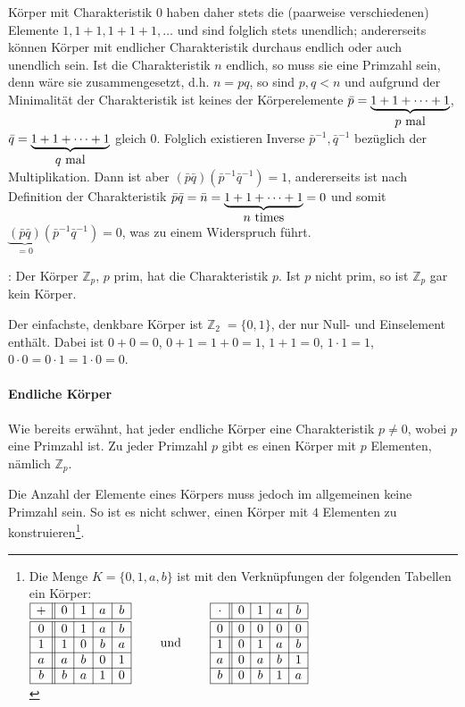 \begin{refsegment}
Körper mit Charakteristik $0$ haben daher stets die (paarweise verschiedenen) Elemente $1, 1+1, 1+1+1, \dots$ und sind folglich stets unendlich; andererseits können Körper mit endlicher Charakteristik durchaus endlich oder auch unendlich sein.
Ist die Charakteristik $n$ endlich, so muss sie eine Primzahl sein, denn wäre sie zusammengesetzt, d.h. $n=pq$, so sind $p,q<n$ und aufgrund der Minimalität der Charakteristik ist keines der Körperelemente $\bar p=\underbrace{1 + 1 + \cdots + 1}_{\hbox{$p$ mal}}$, $\bar q=\underbrace{1 + 1 + \cdots + 1}_{\hbox{$q$ mal}}$ gleich $0$. Folglich existieren Inverse $\bar p^{-1},\bar q^{-1}$ bezüglich der Multiplikation. Dann ist aber $(\bar p\bar q)( \bar p^{-1}\bar q^{-1})=1$, andererseits ist nach Definition der Charakteristik $\bar p\bar q=\bar n=\underbrace{1+1+\dots+1}_{\hbox{$n$ times}}=0$ und somit $\underbrace{(\bar p\bar q)}_{=0}( \bar p^{-1}\bar q^{-1})=0$, was zu einem Widerspruch führt.

\begin{example}{:} Der Körper ${\mathbb Z}_p$, $p$ prim, hat die Charakteristik $p$. Ist $p$ nicht prim, so ist ${\mathbb Z}_p$ gar kein Körper.
\end{example}

Der einfachste, denkbare Körper ist ${\mathbb Z}_2 \; = \{ 0,1\}$, der nur Null- und Einselement enthält. Dabei ist $0+0=0$, $0+1=1+0=1$, $1+1=0$, $1\cdot 1=1$, $0\cdot 0=0\cdot 1=1\cdot 0=0$.

\paragraph*{Endliche Körper}
Wie bereits erwähnt, hat jeder endliche Körper eine Charakteristik $p\ne 0$, wobei $p$ eine Primzahl ist. Zu jeder Primzahl $p$ gibt es einen Körper mit $p$ Elementen, nämlich ${\mathbb Z}_p$.

Die Anzahl der Elemente eines Körpers muss jedoch im allgemeinen keine Primzahl sein. So ist es nicht schwer, einen Körper mit $4$ Elementen zu konstruieren\footnote{%
Die Menge $K=\{0,1,a,b\}$ ist mit den Verknüpfungen der folgenden Tabellen ein Körper:\\
$
\begin{array}{|c||c|c|c|c|}
\hline
+ & 0 & 1 & a & b\\
\hline \hline
0 & 0 & 1 & a & b\\
\hline
1 & 1 & 0 & b & a\\
\hline
a & a & b & 0 & 1\\
\hline
b & b & a & 1 & 0\\
\hline
\end{array} \qquad {\rm ~und~} \qquad
\begin{array}{|c||c|c|c|c|}
\hline
\cdot & 0 & 1 & a & b\\
\hline \hline
0 & 0 & 0 & 0 & 0\\
\hline
1 & 0 & 1 & a & b\\
\hline
a & 0 & a & b & 1\\
\hline
b & 0 & b & 1 & a\\
\hline
\end{array}
$\\
}.


\end{refsegment}

